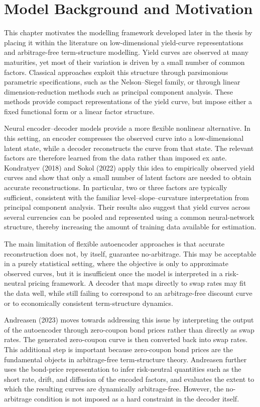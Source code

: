 \chapter{Model Background and Motivation}
\label{ch:model-background}

This chapter motivates the modelling framework developed later in the thesis by placing it within the literature on low-dimensional yield-curve representations and arbitrage-free term-structure modelling. Yield curves are observed at many maturities, yet most of their variation is driven by a small number of common factors. Classical approaches exploit this structure through parsimonious parametric specifications, such as the Nelson--Siegel family, or through linear dimension-reduction methods such as principal component analysis. These methods provide compact representations of the yield curve, but impose either a fixed functional form or a linear factor structure.

Neural encoder--decoder models provide a more flexible nonlinear alternative. In this setting, an encoder compresses the observed curve into a low-dimensional latent state, while a decoder reconstructs the curve from that state. The relevant factors are therefore learned from the data rather than imposed ex ante. Kondratyev (2018) and Sokol (2022) apply this idea to empirically observed yield curves and show that only a small number of latent factors are needed to obtain accurate reconstructions. In particular, two or three factors are typically sufficient, consistent with the familiar level--slope--curvature interpretation from principal component analysis. Their results also suggest that yield curves across several currencies can be pooled and represented using a common neural-network structure, thereby increasing the amount of training data available for estimation.

The main limitation of flexible autoencoder approaches is that accurate reconstruction does not, by itself, guarantee no-arbitrage. This may be acceptable in a purely statistical setting, where the objective is only to approximate observed curves, but it is insufficient once the model is interpreted in a risk-neutral pricing framework. A decoder that maps directly to swap rates may fit the data well, while still failing to correspond to an arbitrage-free discount curve or to economically consistent term-structure dynamics.

Andreasen (2023) moves towards addressing this issue by interpreting the output of the autoencoder through zero-coupon bond prices rather than directly as swap rates. The generated zero-coupon curve is then converted back into swap rates. This additional step is important because zero-coupon bond prices are the fundamental objects in arbitrage-free term-structure theory. Andreasen further uses the bond-price representation to infer risk-neutral quantities such as the short rate, drift, and diffusion of the encoded factors, and evaluates the extent to which the resulting curves are dynamically arbitrage-free. However, the no-arbitrage condition is not imposed as a hard constraint in the decoder itself.

